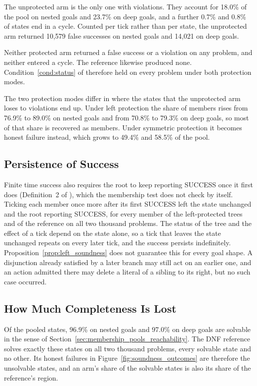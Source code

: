     The unprotected arm is the only one with violations.
    They account for 18.0\% of the pool on nested goals and 23.7\% on deep goals, and a further 0.7\% and 0.8\% of states end in a cycle.
    Counted per tick rather than per state, the unprotected arm returned 10,579 false successes on nested goals and 14,021 on deep goals.

    Neither protected arm returned a false success or a violation on any problem, and neither entered a cycle.
    The reference likewise produced none.
    Condition~\ref{cond:status} of \probprime therefore held on every problem under both protection modes.

    The two protection modes differ in where the states that the unprotected arm loses to violations end up.
    Under left protection the share of members rises from 76.9\% to 89.0\% on nested goals and from 70.8\% to 79.3\% on deep goals, so most of that share is recovered as members.
    Under symmetric protection it becomes honest failure instead, which grows to 49.4\% and 58.5\% of the pool.

    \subsection{Persistence of Success}
    \label{subsec:interference_persistence}
    Finite time success also requires the root to keep reporting SUCCESS once it first does (Definition~2 of \cite{cai2021}), which the membership test does not check by itself.
    Ticking each member once more after its first SUCCESS left the state unchanged and the root reporting SUCCESS, for every member of the left-protected trees and of the reference on all two thousand problems.
    The status of the tree and the effect of a tick depend on the state alone, so a tick that leaves the state unchanged repeats on every later tick, and the success persists indefinitely.
    Proposition~\ref{prop:left_soundness} does not guarantee this for every goal shape.
    A disjunction already satisfied by a later branch may still act on an earlier one, and an action admitted there may delete a literal of a sibling to its right, but no such case occurred.

    \subsection{How Much Completeness Is Lost}
    \label{subsec:interference_completeness}
    Of the pooled states, 96.9\% on nested goals and 97.0\% on deep goals are solvable in the sense of Section~\ref{sec:membership_pools_reachability}.
    The DNF reference solves exactly these states on all two thousand problems, every solvable state and no other.
    Its honest failures in Figure~\ref{fig:soundness_outcomes} are therefore the unsolvable states, and an arm's share of the solvable states is also its share of the reference's region.

